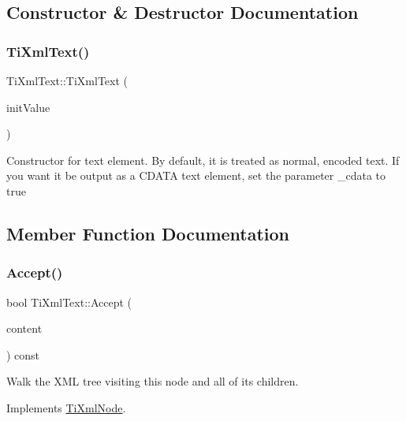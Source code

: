 \subsection{Constructor \& Destructor Documentation}
\mbox{\label{class_ti_xml_text_af659e77c6b87d684827f35a8f4895960}} 
\subsubsection{\texorpdfstring{Ti\+Xml\+Text()}{TiXmlText()}}
{\footnotesize\ttfamily Ti\+Xml\+Text\+::\+Ti\+Xml\+Text (\begin{DoxyParamCaption}\item[{const char $\ast$}]{init\+Value }\end{DoxyParamCaption})\hspace{0.3cm}{\ttfamily [inline]}}

Constructor for text element. By default, it is treated as normal, encoded text. If you want it be output as a C\+D\+A\+TA text element, set the parameter \+\_\+cdata to \textquotesingle{}true\textquotesingle{} 

\subsection{Member Function Documentation}
\mbox{\label{class_ti_xml_text_af65964326eac4640bfb97d4622fa0de2}} 
\subsubsection{\texorpdfstring{Accept()}{Accept()}}
{\footnotesize\ttfamily bool Ti\+Xml\+Text\+::\+Accept (\begin{DoxyParamCaption}\item[{\hyperlink{class_ti_xml_visitor}{Ti\+Xml\+Visitor} $\ast$}]{content }\end{DoxyParamCaption}) const\hspace{0.3cm}{\ttfamily [virtual]}}

Walk the X\+ML tree visiting this node and all of its children. 

Implements \hyperlink{class_ti_xml_node_acc0f88b7462c6cb73809d410a4f5bb86}{Ti\+Xml\+Node}.

